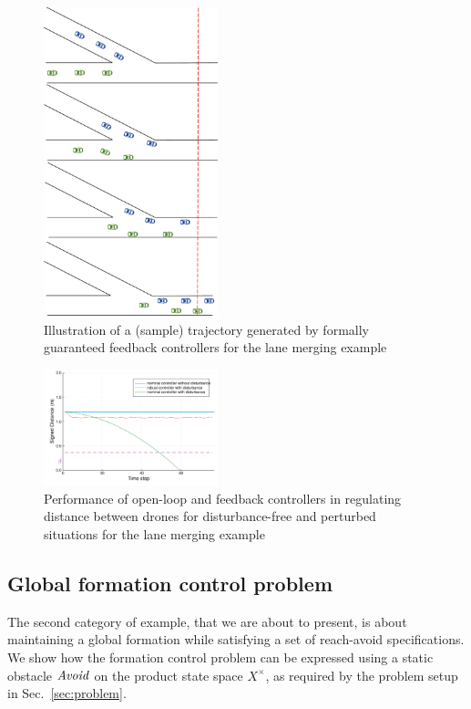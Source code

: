 \begin{figure}
	\centering
	\includegraphics[width=0.45\textwidth,height=0.4\textheight]{figures/merge.pdf}
	\caption{Illustration of a (sample) trajectory generated by formally guaranteed feedback controllers for the lane merging example}
	\label{fig:merge}
\end{figure}

\begin{figure}[t]
	\centering
	\includegraphics[width=0.45\textwidth]{figures/dist_merging.pdf}
	\caption{Performance of open-loop and feedback controllers in regulating distance between drones for disturbance-free and perturbed situations for the lane merging example}
	\label{fig:merging_distance}
\end{figure}


\subsection{Global formation control problem}\label{sec:global formation control}

The second category of example, that we are about to present, is about maintaining a global formation while satisfying a set of reach-avoid specifications.
We show how the formation control problem can be expressed using a static obstacle $\mathit{Avoid}$ on the product state space $X^\times$, as required by the problem setup in Sec.~\ref{sec:problem}.

